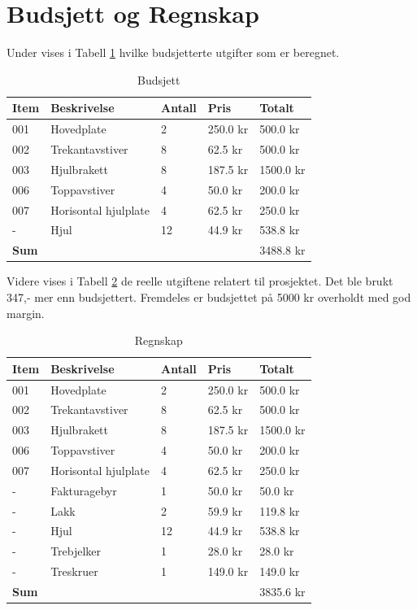 \section{Budsjett og Regnskap}
Under vises i Tabell \ref{TBL1} hvilke budsjetterte utgifter som er beregnet.
\begin{table}[H]
\begin{tabular}{l l l l l}
 \textbf{Item} & \textbf{Beskrivelse} & \textbf{Antall} & \textbf{Pris} & \textbf{Totalt}  \\
\hline
001&Hovedplate&2&250.0 kr&500.0 kr\\
002&Trekantavstiver&8&62.5 kr&500.0 kr\\
003&Hjulbrakett&8&187.5 kr& 1500.0 kr\\
006&Toppavstiver&4&50.0 kr& 200.0 kr\\
007&Horisontal hjulplate&4&62.5 kr& 250.0 kr\\
-&Hjul&12&44.9 kr& 538.8 kr\\
\hline
\textbf{Sum}&&&&3488.8 kr\\
\hline
\end{tabular}
\caption{Budsjett}
\label{TBL1}
\end{table}
Videre vises i Tabell \ref{TBL2} de reelle utgiftene relatert til prosjektet. Det ble brukt 347,- mer enn budsjettert. Fremdeles er budsjettet på 5000 kr overholdt med god margin.
\begin{table}[H]
\begin{tabular}{l l l l l}
 \textbf{Item} & \textbf{Beskrivelse} & \textbf{Antall} & \textbf{Pris} & \textbf{Totalt}  \\
\hline
001&Hovedplate&2&250.0 kr&500.0 kr\\
002&Trekantavstiver&8&62.5 kr&500.0 kr\\
003&Hjulbrakett&8&187.5 kr& 1500.0 kr\\
006&Toppavstiver&4&50.0 kr& 200.0 kr\\
007&Horisontal hjulplate&4&62.5 kr& 250.0 kr\\
-&Fakturagebyr&1&50.0 kr&50.0 kr\\
-&Lakk&2&59.9 kr&119.8 kr\\
-&Hjul&12&44.9 kr& 538.8 kr\\
-&Trebjelker&1&28.0 kr&28.0 kr\\
-&Treskruer&1&149.0 kr&149.0 kr\\
\hline
\textbf{Sum}&&&&3835.6 kr\\
\hline
\end{tabular}
\caption{Regnskap}
\label{TBL2}
\end{table}
